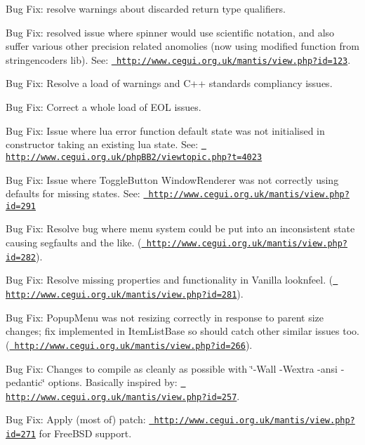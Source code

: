\begin{DoxyItemize}
\item Bug Fix\+: resolve warnings about discarded return type qualifiers.
\item Bug Fix\+: resolved issue where spinner would use scientific notation, and also suffer various other precision related anomolies (now using modified function from stringencoders lib). See\+: \href{http://www.cegui.org.uk/mantis/view.php?id=123}{\texttt{ http\+://www.\+cegui.\+org.\+uk/mantis/view.\+php?id=123}}.
\item Bug Fix\+: Resolve a load of warnings and C++ standards compliancy issues.
\item Bug Fix\+: Correct a whole load of E\+OL issues.
\item Bug Fix\+: Issue where lua error function default state was not initialised in constructor taking an existing lua state. See\+: \href{http://www.cegui.org.uk/phpBB2/viewtopic.php?t=4023}{\texttt{ http\+://www.\+cegui.\+org.\+uk/php\+B\+B2/viewtopic.\+php?t=4023}}
\item Bug Fix\+: Issue where Toggle\+Button Window\+Renderer was not correctly using defaults for missing states. See\+: \href{http://www.cegui.org.uk/mantis/view.php?id=291}{\texttt{ http\+://www.\+cegui.\+org.\+uk/mantis/view.\+php?id=291}}
\item Bug Fix\+: Resolve bug where menu system could be put into an inconsistent state causing segfaults and the like. (\href{http://www.cegui.org.uk/mantis/view.php?id=282}{\texttt{ http\+://www.\+cegui.\+org.\+uk/mantis/view.\+php?id=282}}).
\item Bug Fix\+: Resolve missing properties and functionality in Vanilla looknfeel. (\href{http://www.cegui.org.uk/mantis/view.php?id=281}{\texttt{ http\+://www.\+cegui.\+org.\+uk/mantis/view.\+php?id=281}}).
\item Bug Fix\+: Popup\+Menu was not resizing correctly in response to parent size changes; fix implemented in Item\+List\+Base so should catch other similar issues too. (\href{http://www.cegui.org.uk/mantis/view.php?id=266}{\texttt{ http\+://www.\+cegui.\+org.\+uk/mantis/view.\+php?id=266}}).
\item Bug Fix\+: Changes to compile as cleanly as possible with \char`\"{}-\/\+Wall -\/\+Wextra -\/ansi -\/pedantic\char`\"{} options. Basically inspired by\+: \href{http://www.cegui.org.uk/mantis/view.php?id=257}{\texttt{ http\+://www.\+cegui.\+org.\+uk/mantis/view.\+php?id=257}}.
\item Bug Fix\+: Apply (most of) patch\+: \href{http://www.cegui.org.uk/mantis/view.php?id=271}{\texttt{ http\+://www.\+cegui.\+org.\+uk/mantis/view.\+php?id=271}} for Free\+B\+SD support.

\end{DoxyItemize}
